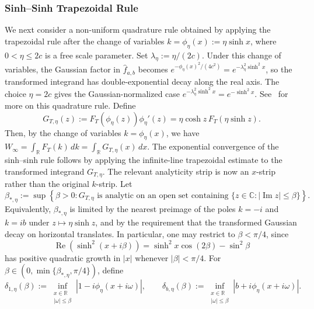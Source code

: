 \documentclass[10pt,reqno]{article}
\numberwithin{equation}{section}
\theoremstyle{plain}
\theoremstyle{definition}
\begin{document}
\subsubsection{Sinh--Sinh Trapezoidal Rule}
\label{sinh-trap-rule-subsub} 
We next consider a non-uniform quadrature rule obtained by applying the trapezoidal rule after the change of variables \(k=\phi_\eta(x):=\eta\sinh x\), where \(0<\eta\le 2c\) is a free scale parameter. Set \(\lambda_\eta:=\eta/(2c)\). Under this change of variables, the Gaussian factor in \(\hat f_{a,b}\) becomes \(e^{-\phi_\eta(x)^2/(4c^2)}=e^{-\lambda_\eta^2\sinh^2 x}\), so the transformed integrand has double-exponential decay along the real axis. The choice \(\eta=2c\) gives the Gaussian-normalized case \(e^{-\lambda_\eta^2\sinh^2 x}=e^{-\sinh^2 x}\). See~\cite[Section~15]{trefethen2014exponentially} for more on this quadrature rule. Define
\begin{equation}\label{eq:sinh-transformed-integrand}
G_{T,\eta}(z) := F_T(\phi_\eta(z)) \phi_\eta'(z) = \eta\cosh z\, F_T(\eta\sinh z).
\end{equation}
Then, by the change of variables \(k=\phi_\eta(x)\), we have \(W_\infty=\int_{\mathbb R}F_T(k)\,dk=\int_{\mathbb R}G_{T,\eta}(x)\,dx\). The exponential convergence of the sinh--sinh rule follows by applying the infinite-line trapezoidal estimate to the transformed integrand \(G_{T,\eta}\). The relevant analyticity strip is now an \(x\)-strip rather than the original \(k\)-strip. Let
\begin{equation}\label{eq:sinh-beta-star-def}
\beta_{\ast,\eta} := \sup\left\{\beta>0: G_{T,\eta} \text{ is analytic on an open set containing } \{z\in\mathbb C:|\operatorname{Im}z|\le\beta\}\right\}.
\end{equation}
Equivalently, \(\beta_{\ast,\eta}\) is limited by the nearest preimage of the poles \(k=-i\) and \(k=ib\) under \(z\mapsto \eta\sinh z\), and by the requirement that the transformed Gaussian decay on horizontal translates. In particular, one may restrict to \(\beta<\pi/4\), since
\begin{equation}
\operatorname{Re}(\sinh^2(x+i\beta)) = \sinh^2x\cos(2\beta)-\sin^2\beta
\end{equation}
has positive quadratic growth in \(|x|\) whenever \(|\beta|<\pi/4\). 
For \(\beta\in(0,\min\{\beta_{\ast,\eta},\pi/4\})\), define
\begin{equation}\label{eq:sinh-denom-distances}
\delta_{1,\eta}(\beta) := \inf_{\substack{x\in\mathbb R\\ |\omega|\le \beta}}\left|1-i\phi_\eta(x+i\omega)\right|, \qquad \delta_{b,\eta}(\beta) := \inf_{\substack{x\in\mathbb R\\ |\omega|\le \beta}}\left|b+i\phi_\eta(x+i\omega)\right|.
\end{equation}
\end{document}
